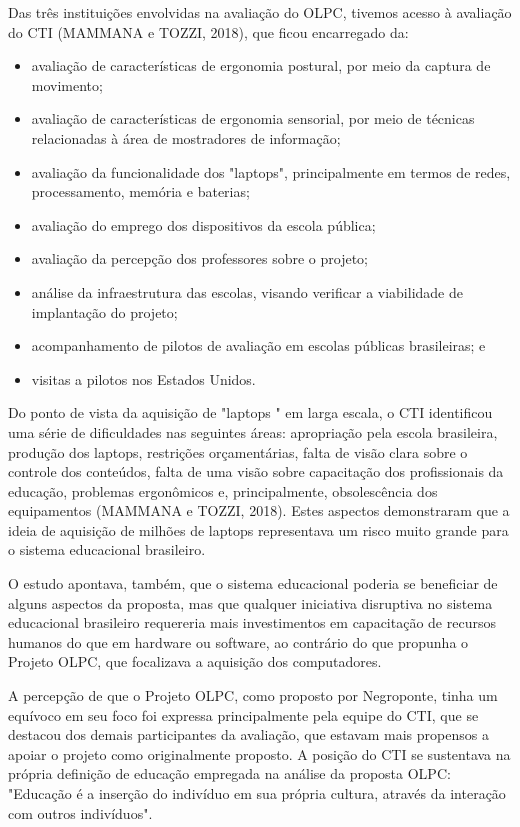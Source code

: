 Das três instituições envolvidas na avaliação do OLPC, tivemos acesso à avaliação do CTI  (MAMMANA e TOZZI, 2018), que ficou encarregado da:


\begin{itemize}
\item avaliação de características de ergonomia postural, por meio da captura de movimento;
\item avaliação de características de ergonomia sensorial, por meio de técnicas relacionadas à área de mostradores de informação;
\item avaliação da funcionalidade dos "laptops", principalmente em termos de redes, processamento, memória e baterias;
\item avaliação do emprego dos dispositivos  da escola pública;
\item avaliação da percepção dos professores sobre o projeto;
\item análise da infraestrutura das escolas, visando verificar a viabilidade de implantação do projeto;
\item acompanhamento de pilotos de avaliação em escolas públicas brasileiras; e
\item visitas a pilotos nos Estados Unidos.
\end{itemize}

Do ponto de vista da aquisição de "laptops " em larga escala, o CTI identificou uma série de dificuldades nas seguintes áreas: apropriação pela escola brasileira, produção dos laptops, restrições orçamentárias, falta de visão clara sobre o controle dos conteúdos, falta de uma visão sobre capacitação dos profissionais da educação, problemas ergonômicos e, principalmente, obsolescência dos equipamentos (MAMMANA e TOZZI, 2018). Estes aspectos demonstraram que a ideia de aquisição de milhões de laptops representava um risco muito grande para o sistema educacional brasileiro.

O estudo apontava, também, que o sistema educacional poderia se beneficiar de alguns aspectos da proposta, mas que qualquer iniciativa disruptiva no sistema educacional brasileiro requereria mais investimentos em capacitação de recursos humanos do que em hardware ou software, ao contrário do que propunha o Projeto OLPC, que focalizava a aquisição dos computadores.

A percepção de que o Projeto OLPC, como proposto por Negroponte, tinha um equívoco em seu foco foi expressa principalmente pela equipe do CTI, que se destacou dos demais participantes da avaliação, que estavam mais propensos a apoiar o projeto como originalmente proposto. A posição do CTI se sustentava na própria definição de educação empregada na análise da proposta OLPC: "Educação é a inserção do indivíduo em sua própria cultura, através da interação com outros indivíduos".

